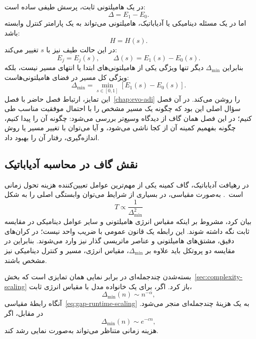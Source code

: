در یک هامیلتونی ثابت، پرسش طیفی ساده است:
\[
\Delta=E_1-E_0.
\]
اما در یک مسئله دینامیکی یا آدیاباتیک، هامیلتونی می‌تواند به یک پارامتر کنترل وابسته باشد:
\[
H=H(s).
\]
در این حالت طیف نیز با $s$ تغییر می‌کند:
\begin{equation}
	E_j=E_j(s),
	\qquad
	\Delta(s)=E_1(s)-E_0(s).
\end{equation}
بنابراین $\Delta_{\min}$ دیگر تنها ویژگی یکی از هامیلتونی‌های ابتدا یا انتهای مسیر نیست، بلکه ویژگی کل مسیر در فضای هامیلتونی‌هاست:
\begin{equation}
	\Delta_{\min}
	=
	\min_{s\in[0,1]}
	\left[E_1(s)-E_0(s)\right].
\end{equation}
این تمایز، ارتباط فصل حاضر با فصل~\ref{chap:evo-adi} را روشن می‌کند.
در آن فصل سؤال اصلی این بود که چگونه یک مسیر مشخص را با احتمال موفقیت مناسب طی کنیم؛ در این فصل همان گاف از دیدگاه وسیع‌تر بررسی می‌شود: چگونه آن را پیدا کنیم، چگونه بفهمیم کمینه آن از کجا ناشی می‌شود، و آیا می‌توان با تغییر مسیر یا روش اندازه‌گیری، رفتار آن را بهبود داد.

\subsection{نقش گاف در محاسبه آدیاباتیک}
\label{sec:gap-adiabatic-role}

در رهیافت آدیاباتیک، گاف کمینه یکی از مهم‌ترین عوامل تعیین‌کننده هزینه تحول زمانی است~\cite{Farhi2000,GapJansen2007,AlbashLidar2018}.
به‌صورت مقیاسی، در بسیاری از شرایط می‌توان وابستگی اصلی را به شکل
\begin{equation}
	T\propto \frac{1}{\Delta_{\min}^{2}}
	\label{eq:gap-runtime-scaling}
\end{equation}
بیان کرد، مشروط بر اینکه مقیاس انرژی هامیلتونی و سایر عوامل دینامیکی در مقایسه ثابت نگه داشته شوند.
این رابطه یک قانون عمومی با ضریب واحد نیست؛ در کران‌های دقیق، مشتق‌های هامیلتونی و عناصر ماتریسی گذار نیز وارد می‌شوند.
بنابراین در مقایسه دو پروتکل باید علاوه بر $\Delta_{\min}$، مقیاس انرژی، مسیر و کنترل دینامیکی نیز مشخص باشند.

بسته‌شدن چندجمله‌ای در برابر نمایی همان تمایزی است که بخش~\ref{sec:complexity-scaling} باز کرد.
اگر، برای یک خانواده مدل با مقیاس انرژی ثابت،
\begin{equation}
	\Delta_{\min}(n)\sim n^{-\alpha},
\end{equation}
آنگاه رابطهٔ مقیاسی~\eqref{eq:gap-runtime-scaling} به یک هزینهٔ چندجمله‌ای منجر می‌شود.
در مقابل، اگر
\begin{equation}
	\Delta_{\min}(n)\sim e^{-cn},
\end{equation}
هزینه زمانی متناظر می‌تواند به‌صورت نمایی رشد کند.

